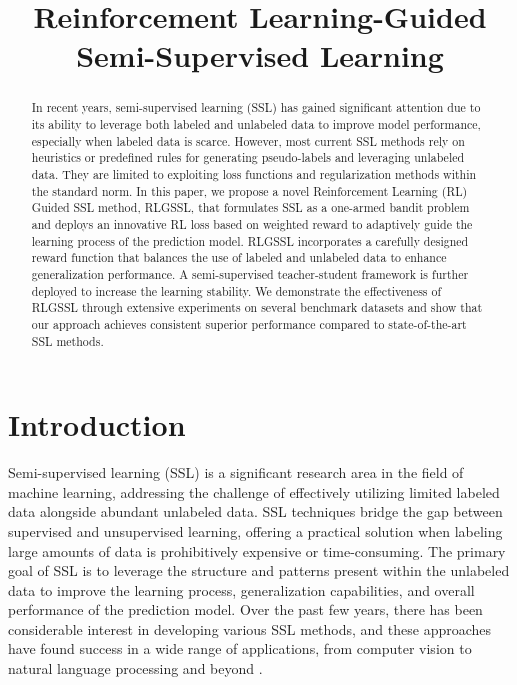 
\title{Reinforcement Learning-Guided \\ Semi-Supervised Learning}
\maketitle


\begin{abstract}
 In recent years, semi-supervised learning (SSL) has gained significant attention due to its ability to leverage both labeled and unlabeled data to improve model performance, especially when labeled data is scarce. 
However, most current SSL methods 
rely on heuristics or predefined rules for generating pseudo-labels and leveraging unlabeled data. 
They are limited to 
exploiting loss functions and regularization methods within the standard norm.
In this paper, we propose a novel Reinforcement Learning (RL) Guided SSL method, RLGSSL, 
that formulates SSL as a one-armed bandit problem and deploys an innovative RL loss based on weighted reward
to adaptively guide the learning process of the prediction model. 
RLGSSL incorporates a carefully designed reward function 
that balances the use of labeled and unlabeled data to enhance generalization performance. 
A semi-supervised teacher-student framework is further deployed to increase the learning stability. 
We demonstrate the effectiveness of RLGSSL through extensive experiments on several benchmark datasets 
and show that our approach achieves consistent superior performance compared to state-of-the-art SSL methods. 
\end{abstract}

\section{Introduction}
Semi-supervised learning (SSL) is a significant research area in the field of machine learning, 
addressing the challenge of effectively utilizing limited labeled data alongside abundant unlabeled data. SSL techniques bridge the gap between supervised and unsupervised learning, offering a practical solution when labeling large amounts of data is prohibitively expensive or time-consuming. The primary goal of SSL is to leverage the structure and patterns present within the unlabeled data to improve the learning process, generalization capabilities, and overall performance of the prediction model. 
Over the past few years, there has been considerable interest in developing various SSL methods, and these approaches have found success in a wide range of applications, from computer vision \cite{berthelot2019mixmatch}  to natural language processing \cite{howard2018universal} 
and beyond \cite{rasmus2015semi, zhu2009introduction}.

